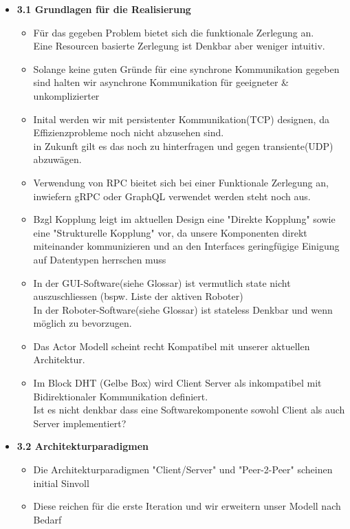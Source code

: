 \documentclass{article}
\begin{document}
\begin{itemize}
	\item \textbf{3.1 Grundlagen für die Realisierung}
		\begin{itemize}
			\item Für das gegeben Problem bietet sich die funktionale Zerlegung an. \\
                Eine Resourcen basierte Zerlegung ist Denkbar aber weniger intuitiv.
                \item Solange keine guten Gründe für eine synchrone Kommunikation gegeben sind halten wir asynchrone Kommunikation für geeigneter \& unkomplizierter
                \item Inital werden wir mit persistenter Kommunikation(TCP) designen, da Effizienzprobleme noch nicht abzusehen sind. \\
                in Zukunft gilt es das noch zu hinterfragen und gegen transiente(UDP) abzuwägen.
                \item Verwendung von RPC bieitet sich bei einer Funktionale Zerlegung an, inwiefern gRPC oder GraphQL verwendet werden steht noch aus.
                \item Bzgl Kopplung leigt im aktuellen Design eine "Direkte Kopplung" sowie eine "Strukturelle Kopplung" vor, da unsere Komponenten direkt miteinander kommunizieren und an den Interfaces geringfügige Einigung auf Datentypen herrschen muss
                \item In der GUI-Software(siehe Glossar) ist vermutlich state nicht auszuschliessen (bspw. Liste der aktiven Roboter) \\
                In der Roboter-Software(siehe Glossar) ist stateless Denkbar und wenn möglich zu bevorzugen.
                \item Das Actor Modell scheint recht Kompatibel mit unserer aktuellen Architektur.
                \item Im Block DHT (Gelbe Box) wird Client Server als inkompatibel mit Bidirektionaler Kommunikation definiert. \\
                Ist es nicht denkbar dass eine Softwarekomponente sowohl Client als auch Server implementiert?
		\end{itemize}
	\item \textbf{3.2 Architekturparadigmen}
		\begin{itemize}
			\item Die Architekturparadigmen "Client/Server" und "Peer-2-Peer" scheinen initial Sinvoll
                \item Diese reichen für die erste Iteration und wir erweitern unser Modell nach Bedarf
		\end{itemize}
\end{itemize}
 
\end{document}
